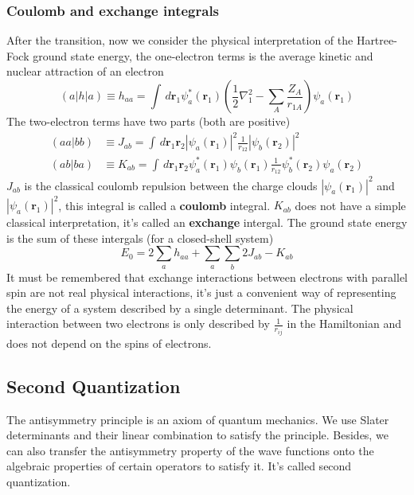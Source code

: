 \documentclass[11pt]{article}
\begin{document}
\subsubsection{Coulomb and exchange integrals}
After the transition, now we consider the physical interpretation of the Hartree-Fock ground state energy, the one-electron terms is the average kinetic and nuclear attraction
of an electron
\begin{equation}
    (a|h|a)\equiv h_{aa}=\int\,d\mathbf{r}_1\psi_a^*(\mathbf{r}_1)(\frac{1}{2}\nabla_1^2-\sum_{A}\frac{Z_A}{r_{1A}})\psi_a(\mathbf{r}_1) 
\end{equation}
The two-electron terms have two parts (both are positive)
\begin{align}
    (aa|bb)&\equiv J_{ab}=\int\,d\mathbf{r}_1\mathbf{r}_2|\psi_a(\mathbf{r}_1)|^2\frac{1}{r_{12}}|\psi_b(\mathbf{r}_2)|^2\\
    (ab|ba)&\equiv K_{ab}=\int\,d\mathbf{r}_1\mathbf{r}_2\psi_a^*(\mathbf{r}_1)\psi_b(\mathbf{r}_1)\frac{1}{r_{12}}\psi_b^*(\mathbf{r}_2)\psi_a(\mathbf{r}_2)
\end{align}
$J_{ab}$ is the classical coulomb repulsion between the charge clouds $|\psi_a(\mathbf{r}_1)|^2$ and $|\psi_a(\mathbf{r}_1)|^2$, this integral is called a \textbf{coulomb} integral.
$K_{ab}$ does not have a simple classical interpretation, it's called an \textbf{exchange} intergal.
The ground state energy is the sum of these intergals (for a closed-shell system)
\begin{equation}
    E_0=2\sum_{a}h_{aa}+\sum_{a}\sum_{b}2J_{ab}-K_{ab}
\end{equation}
It must be remembered that exchange interactions between electrons with parallel spin are not real physical interactions, it's just a
convenient way of representing the energy of a system described by a single determinant. The physical interaction between two electrons
is only described by $\frac{1}{r_{ij}}$ in the Hamiltonian and does not depend on the spins of electrons.
\subsection{Second Quantization}
The antisymmetry principle is an axiom of quantum mechanics. We use Slater determinants and their linear combination to satisfy the principle. Besides, we can also transfer 
the antisymmetry property of the wave functions onto the algebraic properties of certain operators to satisfy it. It's called second quantization.
\end{document}
